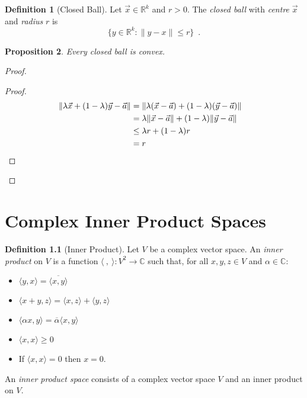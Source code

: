 \documentclass{book}
\let\qed\relax
\newtheorem{prop}{Proposition}[chapter]
\theoremstyle{definition}
\newtheorem{df}[prop]{Definition}
\begin{document}
\begin{df}[Closed Ball]
Let $\vec{x} \in \mathbb{R}^k$ and $r > 0$. The \emph{closed ball} with \emph{centre} $\vec{x}$ and \emph{radius} $r$ is
\[ \{ y \in \mathbb{R}^k : \| y - x \| \leq r \} \enspace . \]
\end{df}

\begin{prop}
Every closed ball is convex.
\end{prop}

\begin{proof}
\pf
{}
\begin{proof}
\pf
\begin{align*}
\| \lambda \vec{x} + (1 - \lambda) \vec{y} - \vec{a} \|
& = \| \lambda (\vec{x} - \vec{a}) + (1 - \lambda) (\vec{y} - \vec{a}) \| \\
& = \lambda \| \vec{x} - \vec{a} \| + (1 - \lambda) \| \vec{y} - \vec{a} \| \\
& \leq \lambda r + (1 - \lambda) r \\
& = r & \qed
\end{align*}
\end{proof}
\qed
\end{proof}

\chapter{Complex Inner Product Spaces}

\newcommand{\ket}[1]{\ensuremath{\left| {#1} \right\rangle}}
\newcommand{\bra}[1]{\ensuremath{\left\langle {#1} \right|}}

\begin{df}[Inner Product]
Let $V$ be a complex vector space. An \emph{inner product} on $V$ is a function $\langle \ , \ \rangle :  V^2 \rightarrow \mathbb{C}$ such that, for all $x,y,z \in V$ and $\alpha \in \mathbb{C}$:
\begin{itemize}
\item $\langle y,x \rangle = \overline{\langle x,y \rangle}$
\item $\langle x+y,z \rangle = \langle x,z \rangle + \langle y,z \rangle$
\item $\langle \alpha x,y \rangle = \overline{\alpha} \langle x,y \rangle$
\item $\langle x,x \rangle \geq 0$
\item If $\langle x,x \rangle = 0$ then $x = 0$.
\end{itemize}
An \emph{inner product space} consists of a complex vector space $V$ and an inner product on $V$.
\end{df}
\end{document}
